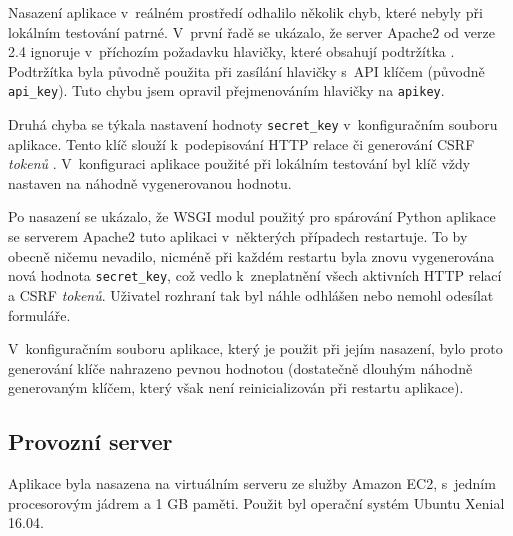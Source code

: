 Nasazení aplikace v~reálném prostředí odhalilo několik chyb, které nebyly při lokálním testování patrné. V~první řadě se ukázalo, že server Apache2 od verze 2.4 ignoruje v~příchozím požadavku hlavičky, které obsahují podtržítka \cite{apache_headers_update}. Podtržítka byla původně použita při zasílání hlavičky s~API klíčem (původně \texttt{api\_key}). Tuto chybu jsem opravil přejmenováním hlavičky na \texttt{apikey}.

Druhá chyba se týkala nastavení hodnoty \texttt{secret\_key} v~konfiguračním souboru aplikace. Tento klíč slouží k~podepisování HTTP relace či generování CSRF \textit{tokenů} \cite{flask_api}. V~konfiguraci aplikace použité při lokálním testování byl klíč vždy nastaven na náhodně vygenerovanou hodnotu.

Po nasazení se ukázalo, že WSGI \cite{python_wsgi} modul použitý pro spárování Python aplikace se serverem Apache2 tuto aplikaci v~některých případech restartuje. To by obecně ničemu nevadilo, nicméně při každém restartu byla znovu vygenerována nová hodnota \texttt{secret\_key}, což vedlo k~zneplatnění všech aktivních HTTP relací a CSRF \textit{tokenů}. Uživatel rozhraní tak byl náhle odhlášen nebo nemohl odesílat formuláře. 

V~konfiguračním souboru aplikace, který je použit při jejím nasazení, bylo proto generování klíče nahrazeno pevnou hodnotou (dostatečně dlouhým náhodně generovaným klíčem, který však není reinicializován při restartu aplikace).



\subsection{Provozní server}

Aplikace byla nasazena na virtuálním serveru ze služby Amazon EC2, s~jedním procesorovým jádrem a 1 GB paměti. Použit byl operační systém Ubuntu Xenial 16.04.

